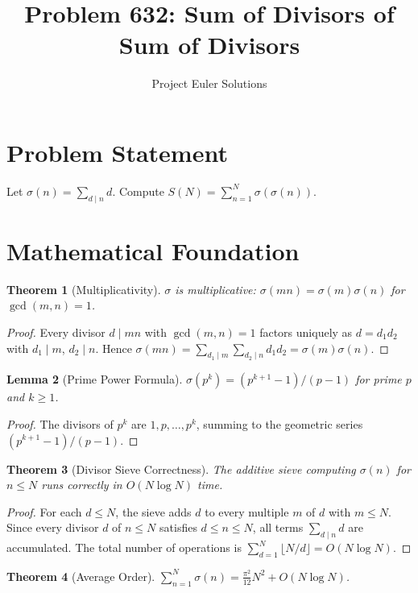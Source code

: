 \documentclass[11pt]{article}
\title{Problem 632: Sum of Divisors of Sum of Divisors}
\author{Project Euler Solutions}
\date{}
\newtheorem{theorem}{Theorem}
\newtheorem{lemma}[theorem]{Lemma}
\begin{document}
\maketitle

\section{Problem Statement}

Let $\sigma(n)=\sum_{d\mid n}d$. Compute $S(N)=\sum_{n=1}^{N}\sigma(\sigma(n))$.

\section{Mathematical Foundation}

\begin{theorem}[Multiplicativity]
$\sigma$ is multiplicative: $\sigma(mn)=\sigma(m)\sigma(n)$ for $\gcd(m,n)=1$.
\end{theorem}

\begin{proof}
Every divisor $d\mid mn$ with $\gcd(m,n)=1$ factors uniquely as $d=d_1 d_2$ with $d_1\mid m$, $d_2\mid n$. Hence $\sigma(mn)=\sum_{d_1\mid m}\sum_{d_2\mid n}d_1 d_2=\sigma(m)\sigma(n)$.
\end{proof}

\begin{lemma}[Prime Power Formula]
$\sigma(p^k)=(p^{k+1}-1)/(p-1)$ for prime $p$ and $k\ge 1$.
\end{lemma}

\begin{proof}
The divisors of $p^k$ are $1,p,\ldots,p^k$, summing to the geometric series $(p^{k+1}-1)/(p-1)$.
\end{proof}

\begin{theorem}[Divisor Sieve Correctness]
The additive sieve computing $\sigma(n)$ for $n\le N$ runs correctly in $O(N\log N)$ time.
\end{theorem}

\begin{proof}
For each $d\le N$, the sieve adds $d$ to every multiple $m$ of $d$ with $m\le N$. Since every divisor $d$ of $n\le N$ satisfies $d\le n\le N$, all terms $\sum_{d\mid n}d$ are accumulated. The total number of operations is $\sum_{d=1}^{N}\lfloor N/d\rfloor = O(N\log N)$.
\end{proof}

\begin{theorem}[Average Order]
$\sum_{n=1}^{N}\sigma(n)=\frac{\pi^2}{12}N^2+O(N\log N)$.
\end{theorem}
\end{document}
